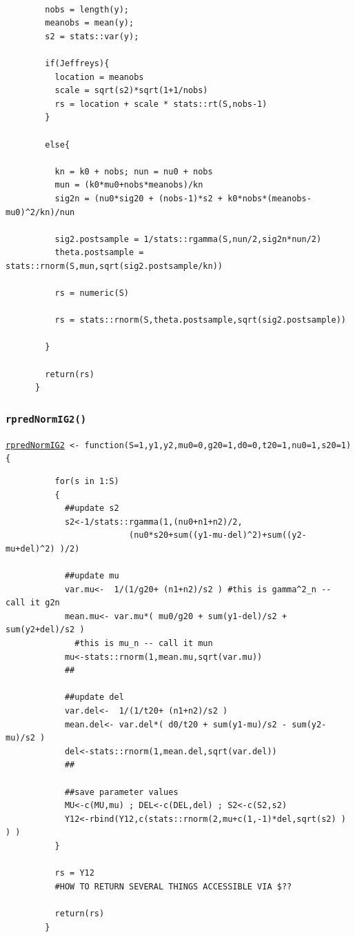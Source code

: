 \documentclass[12pt, a4paper]{article}
\begin{document}
    \begin{verbatim}

        nobs = length(y);
        meanobs = mean(y);
        s2 = stats::var(y);

        if(Jeffreys){
          location = meanobs
          scale = sqrt(s2)*sqrt(1+1/nobs)
          rs = location + scale * stats::rt(S,nobs-1)
        }

        else{

          kn = k0 + nobs; nun = nu0 + nobs
          mun = (k0*mu0+nobs*meanobs)/kn
          sig2n = (nu0*sig20 + (nobs-1)*s2 + k0*nobs*(meanobs-mu0)^2/kn)/nun

          sig2.postsample = 1/stats::rgamma(S,nun/2,sig2n*nun/2)
          theta.postsample = stats::rnorm(S,mun,sqrt(sig2.postsample/kn))

          rs = numeric(S)

          rs = stats::rnorm(S,theta.postsample,sqrt(sig2.postsample))

        }

        return(rs)
      }
    \end{verbatim}

    \subsubsection{\texttt{rpredNormIG2()}}\label{sec:rpredNormIG2}

    \texttt{\hyperref[sec:NormIG2imp]{rpredNormIG2} <- function(S=1,y1,y2,mu0=0,g20=1,d0=0,t20=1,nu0=1,s20=1)\{ }

      \begin{verbatim}
          for(s in 1:S)
          {
            ##update s2
            s2<-1/stats::rgamma(1,(nu0+n1+n2)/2,
                         (nu0*s20+sum((y1-mu-del)^2)+sum((y2-mu+del)^2) )/2)

            ##update mu
            var.mu<-  1/(1/g20+ (n1+n2)/s2 ) #this is gamma^2_n -- call it g2n
            mean.mu<- var.mu*( mu0/g20 + sum(y1-del)/s2 + sum(y2+del)/s2 )
              #this is mu_n -- call it mun
            mu<-stats::rnorm(1,mean.mu,sqrt(var.mu))
            ##

            ##update del
            var.del<-  1/(1/t20+ (n1+n2)/s2 )
            mean.del<- var.del*( d0/t20 + sum(y1-mu)/s2 - sum(y2-mu)/s2 )
            del<-stats::rnorm(1,mean.del,sqrt(var.del))
            ##

            ##save parameter values
            MU<-c(MU,mu) ; DEL<-c(DEL,del) ; S2<-c(S2,s2)
            Y12<-rbind(Y12,c(stats::rnorm(2,mu+c(1,-1)*del,sqrt(s2) ) ) )
          }

          rs = Y12
          #HOW TO RETURN SEVERAL THINGS ACCESSIBLE VIA $??

          return(rs)
        }
      \end{verbatim}
\end{document}

